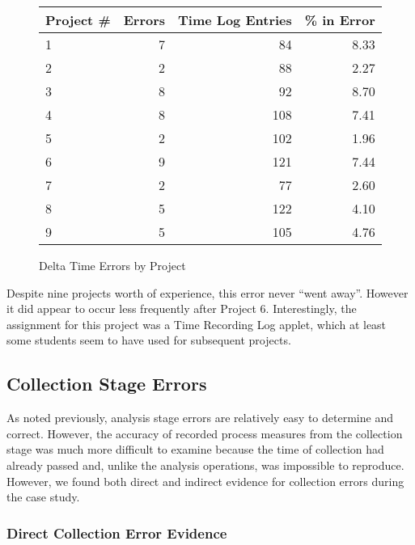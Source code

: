 \begin{figure}
   \begin{center} 
   \begin{tabular}{|l|r|r|r|}\hline 
   Project \#  & Errors & Time Log Entries & \% in Error \\ \hline\hline 
   1  & 7 &  84 &  8.33 \\ \hline 
   2  & 2 &  88 &  2.27 \\ \hline 
   3  & 8 &  92 &  8.70 \\ \hline 
   4  & 8 & 108 &  7.41 \\ \hline  
   5  & 2 & 102 &  1.96 \\ \hline 
   6  & 9 & 121 &  7.44 \\ \hline 
   7  & 2 &  77 &  2.60 \\ \hline 
   8  & 5 & 122 &  4.10 \\ \hline 
   9  & 5 & 105 &  4.76 \\ \hline 
   \end{tabular} \newline \newline
   \end{center} 
   \caption{\label{deltaErrors}Delta Time Errors by Project}
\end{figure}
   
Despite nine projects worth of experience, this error never ``went away''.
However it did appear to occur less frequently after Project 6.
Interestingly, the assignment for this project was a Time Recording Log
applet, which at least some students seem to have used for subsequent
projects.

 
\subsection{Collection Stage Errors}

As noted previously, analysis stage errors are relatively easy to determine
and correct. However, the accuracy of recorded process measures from the
collection stage was much more difficult to examine because the time of
collection had already passed and, unlike the analysis operations, was
impossible to reproduce. However, we found both direct and indirect
evidence for collection errors during the case study.

\subsubsection{Direct Collection Error Evidence}

